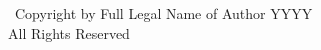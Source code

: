 \thispagestyle{empty}
\mbox{}
\vfill
\begin{doublespace}
\centering
    \vfill
    \textcopyright~Copyright by Full Legal Name of Author YYYY \\
    All Rights Reserved
\end{doublespace}